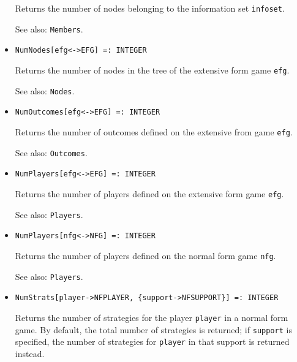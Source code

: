 \begin{itemize}
\bd
Returns the number of nodes belonging to the information
set \verb+infoset+.
\item
[See also:] {\tt Members}.
\ed

\item
\protect \large \begin{verbatim}
NumNodes[efg<->EFG] =: INTEGER
\end{verbatim}\normalsize

\bd
Returns the number of nodes in the tree of the extensive form
game \verb+efg+.
\item
[See also:] {\tt Nodes}.
\ed

\item
\protect \large \begin{verbatim}
NumOutcomes[efg<->EFG] =: INTEGER
\end{verbatim} \normalsize

\bd
Returns the number of outcomes defined on the extensive from
game \verb+efg+.
\item
[See also:] {\tt Outcomes}.
\ed

\item
\protect \large \begin{verbatim}
NumPlayers[efg<->EFG] =: INTEGER
\end{verbatim} \normalsize

\bd
Returns the number of players defined on the extensive form
game \verb+efg+.
\item
[See also:] {\tt Players}.
\ed

\item
\protect \large \begin{verbatim}
NumPlayers[nfg<->NFG] =: INTEGER
\end{verbatim} \normalsize

\bd
Returns the number of players defined on the normal form
game \verb+nfg+.
\item
[See also:] {\tt Players}.
\ed

\item
\protect \large \begin{verbatim}
NumStrats[player->NFPLAYER, {support->NFSUPPORT}] =: INTEGER
\end{verbatim}\normalsize

\bd
Returns the number of strategies for the player \verb+player+
in a normal form game.  By default, the total number of strategies is
returned; if \verb+support+ is specified, the number of strategies
for \verb+player+ in that support is returned instead.
\ed


\end{itemize}

